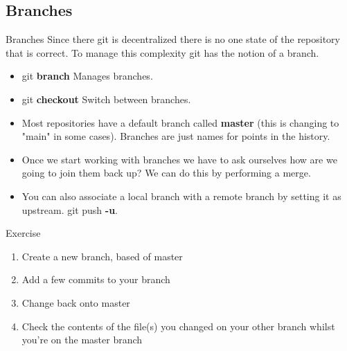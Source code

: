 \documentclass{beamer}
\begin{document}
\subsection{Branches}
\begin{frame}{Branches}
  Since there git is decentralized there is no one state of the repository that is correct. To manage this complexity git has the notion of a branch. 
  \begin{block}{}
    \begin{itemize}
      \item git \textbf{branch}  Manages branches. 
      \item git \textbf{checkout} Switch between branches.
    \end{itemize}
  \end{block}

  \begin{itemize}
    \item Most repositories have a default branch called \textbf{master} (this is changing to "main" in some cases). Branches are just names for points in the history.
    \item Once we start working with branches we have to ask ourselves how are we going to join them back up? We can do this by performing a merge.
    \item You can also associate a local branch with a remote branch by setting it as upstream. git push \textbf{-u}.
  \end{itemize}
\end{frame}

\begin{frame}
  \begin{block}{Exercise}
    \begin{enumerate}
      \item Create a new branch, based of master
      \item Add a few commits to your branch
      \item Change back onto master
      \item Check the contents of the file(s) you changed on your other branch whilst you\rq{}re on the master branch
    \end{enumerate}
  \end{block}
\end{frame}
\end{document}

